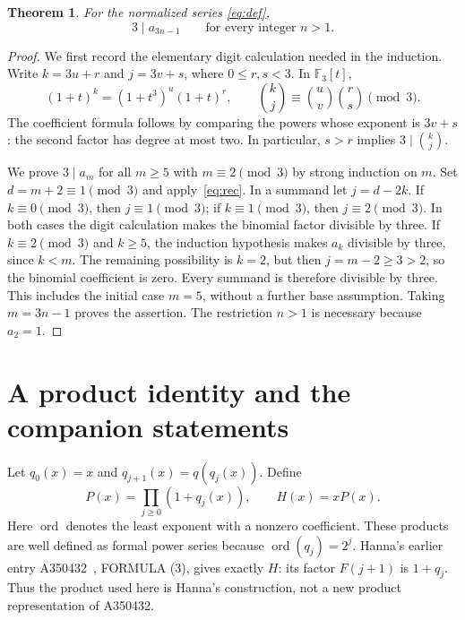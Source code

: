 \documentclass[11pt]{article}
\newtheorem{theorem}{Theorem}
\begin{document}
\begin{theorem}\label{thm:main}
For the normalized series \eqref{eq:def},
\[
 3\mid a_{3n-1}\qquad\text{for every integer }n>1.
\]
\end{theorem}
\begin{proof}
We first record the elementary digit calculation needed in the induction.
Write $k=3u+r$ and $j=3v+s$, where $0\le r,s<3$. In
$\mathbb F_3[t]$,
\[
 (1+t)^k=(1+t^3)^u(1+t)^r,
 \qquad
 \binom{k}{j}\equiv\binom{u}{v}\binom{r}{s}\pmod3.
\]
The coefficient formula follows by comparing the powers whose exponent is
$3v+s$: the second factor has degree at most two. In particular,
$s>r$ implies $3\mid\binom{k}{j}$.

We prove $3\mid a_m$ for all $m\ge5$ with $m\equiv2\pmod3$
by strong induction on $m$. Set $d=m+2\equiv1\pmod3$ and
apply~\eqref{eq:rec}. In a summand let $j=d-2k$.
If $k\equiv0\pmod3$, then $j\equiv1\pmod3$;
if $k\equiv1\pmod3$, then $j\equiv2\pmod3$.
In both cases the digit calculation makes the binomial factor divisible
by three. If $k\equiv2\pmod3$ and $k\ge5$, the induction
hypothesis makes $a_k$ divisible by three, since $k<m$.
The remaining possibility is $k=2$, but then
$j=m-2\ge3>2$, so the binomial coefficient is zero.
Every summand is therefore divisible by three. This includes the initial
case $m=5$, without a further base assumption. Taking $m=3n-1$ proves
the assertion. The restriction $n>1$ is necessary because $a_2=1$.
\end{proof}

\section{A product identity and the companion statements}
Let $q_0(x)=x$ and $q_{j+1}(x)=q(q_j(x))$. Define
\begin{equation}\label{eq:product}
 P(x)=\prod_{j\ge0}(1+q_j(x)),\qquad H(x)=xP(x).
\end{equation}
Here $\operatorname{ord}$ denotes the least exponent with a nonzero coefficient.
These products are well defined as formal power series because
$\operatorname{ord}(q_j)=2^j$. Hanna's earlier entry
A350432~\cite{hanna432}, FORMULA (3), gives exactly $H$:
its factor $F(j+1)$ is $1+q_j$. Thus the product used here is
Hanna's construction, not a new product representation of A350432.
\end{document}
